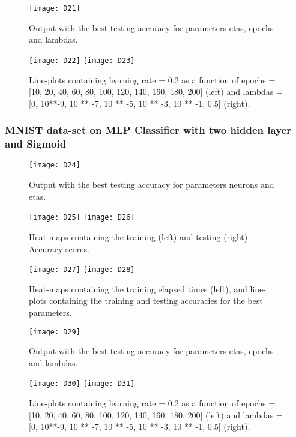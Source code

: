 \begin{figure}[H]
\label{fig:D13}
\centering
\texttt{[image: D21]}
\caption{Output with the best testing accuracy for parameters etas, epochs and lambdas.}
\end{figure}

\begin{figure}[H]
\label{fig:D14}
\centering
\texttt{[image: D22]}
\texttt{[image: D23]}
\caption{Line-plots containing learning rate = 0.2 as a function of epochs = [10, 20, 40, 60, 80, 100, 120, 140, 160, 180, 200] (left) and lambdas = [0, 10**-9, 10 ** -7, 10 ** -5, 10 ** -3, 10 ** -1, 0.5] (right).}
\end{figure}

\subsubsection{MNIST data-set on MLP Classifier with two hidden layer and Sigmoid}
\label{chap:MNIST data-set on MLP Classifier with two hidden layer and Sigmoid}

\begin{figure}[H]
\label{fig:D15}
\centering
\texttt{[image: D24]}
\caption{Output with the best testing accuracy for parameters neurons and etas.}
\end{figure}

\begin{figure}[H]
\label{fig:D16}
\centering
\texttt{[image: D25]}
\texttt{[image: D26]}
\caption{Heat-maps containing the training (left) and testing (right) Accuracy-scores.}
\end{figure}

\begin{figure}[H]
\label{fig:D17}
\centering
\texttt{[image: D27]}
\texttt{[image: D28]}
\caption{Heat-maps containing the training elapsed times (left), and line-plots containing the training and testing accuracies for the best parameters.}
\end{figure}

\begin{figure}[H]
\label{fig:D18}
\centering
\texttt{[image: D29]}
\caption{Output with the best testing accuracy for parameters etas, epochs and lambdas.}
\end{figure}

\begin{figure}[H]
\label{fig:D19}
\centering
\texttt{[image: D30]}
\texttt{[image: D31]}
\caption{Line-plots containing learning rate = 0.2 as a function of epochs = [10, 20, 40, 60, 80, 100, 120, 140, 160, 180, 200] (left) and lambdas = [0, 10**-9, 10 ** -7, 10 ** -5, 10 ** -3, 10 ** -1, 0.5] (right).}
\end{figure}

